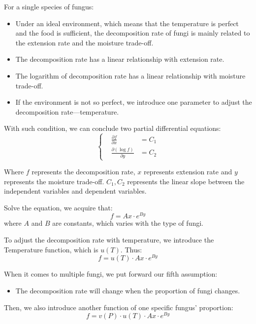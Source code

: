 \documentclass{mcmthesis}
\begin{document}
For a single species of fungus\cite{Lustenhouwer11551}:
\begin{itemize}
  \item Under an ideal environment, which means that the temperature is perfect and the food is sufficient, the decomposition rate of fungi is mainly related to the extension rate and the moisture trade-off.
  \item The decomposition rate has a linear relationship with extension rate.
  \item The logarithm of decomposition rate has a linear relationship with moisture trade-off.
  \item If the environment is not so perfect, we introduce one parameter to adjust the decomposition rate---temperature.
\end{itemize}

With such condition, we can conclude two partial differential equations:
\begin{equation}
  \label{eq6}
  \left\{
  \begin{aligned}
  &\frac{\partial f}{\partial x}&=C_1\\
  &\frac{\partial (\log f)}{\partial y}&=C_2
  \end{aligned}
  \right.
\end{equation}

Where $f$ represents the decomposition rate, $x$ represents extension rate and $y$ represents the moisture trade-off.
$C_1,C_2$ represents the linear slope between the independent variables and dependent variables.

Solve the equation, we acquire that:
\begin{equation}
  f=Ax\cdot e^{By}
\end{equation}
where $A$ and $B$ are constants, which varies with the type of fungi.

To adjust the decomposition rate with temperature, we introduce the Temperature function, which is $u(T)$.
Thus:
\begin{equation}
  f=u(T)\cdot Ax\cdot e^{By}
\end{equation}

When it comes to multiple fungi, we put forward our fifth assumption:
\begin{itemize}
  \item The decomposition rate will change when the proportion of fungi changes.
\end{itemize}
Then, we also introduce another function of one specific fungus' proportion:
\begin{equation}
  f=v(P)\cdot u(T)\cdot Ax\cdot e^{By}
\end{equation}
\end{document}
